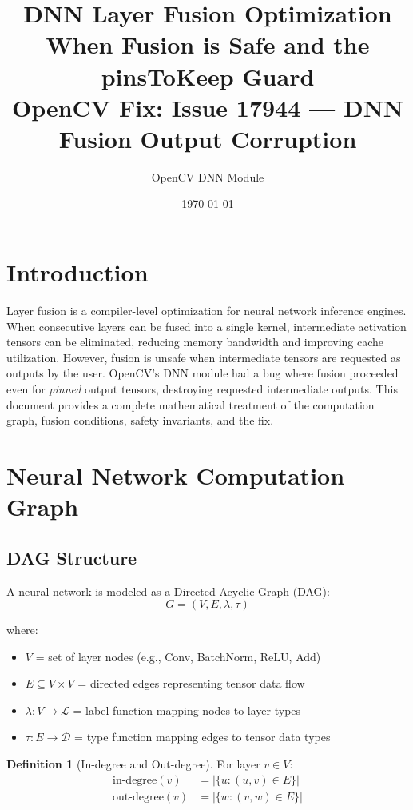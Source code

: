 \documentclass[12pt]{article}
\title{\textbf{DNN Layer Fusion Optimization}\\
\large When Fusion is Safe and the pinsToKeep Guard\\
\normalsize OpenCV Fix: Issue 17944 --- DNN Fusion Output Corruption}
\author{OpenCV DNN Module}
\date{\today}
\theoremstyle{definition}
\newtheorem{definition}{Definition}
\begin{document}
\maketitle
\tableofcontents
\newpage

\section{Introduction}

Layer fusion is a compiler-level optimization for neural network inference engines. When consecutive layers can be fused into a single kernel, intermediate activation tensors can be eliminated, reducing memory bandwidth and improving cache utilization. However, fusion is unsafe when intermediate tensors are requested as outputs by the user. OpenCV's DNN module had a bug where fusion proceeded even for \emph{pinned} output tensors, destroying requested intermediate outputs. This document provides a complete mathematical treatment of the computation graph, fusion conditions, safety invariants, and the fix.

\section{Neural Network Computation Graph}

\subsection{DAG Structure}

A neural network is modeled as a Directed Acyclic Graph (DAG):
\begin{equation}
G = (V, E, \lambda, \tau)
\end{equation}

where:
\begin{itemize}
  \item $V$ = set of layer nodes (e.g., Conv, BatchNorm, ReLU, Add)
  \item $E \subseteq V \times V$ = directed edges representing tensor data flow
  \item $\lambda : V \to \mathcal{L}$ = label function mapping nodes to layer types
  \item $\tau : E \to \mathcal{D}$ = type function mapping edges to tensor data types
\end{itemize}

\begin{definition}[In-degree and Out-degree]
For layer $v \in V$:
\begin{align}
\text{in-degree}(v) &= |\{u : (u,v) \in E\}| \\
\text{out-degree}(v) &= |\{w : (v,w) \in E\}|
\end{align}
\end{definition}
\end{document}
